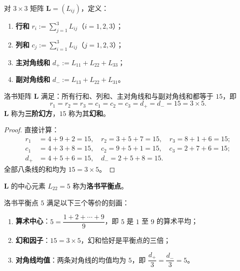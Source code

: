 \begin{definition}[行和、列和与对角线和]\label{def:luoshu_line_sums}
对 $3 \times 3$ 矩阵 $\mathbf{L} = (L_{ij})$，定义：
\begin{enumerate}[label=(\roman*)]
    \item \textbf{行和} $r_i := \sum_{j=1}^{3} L_{ij}$（$i = 1, 2, 3$）；
    \item \textbf{列和} $c_j := \sum_{i=1}^{3} L_{ij}$（$j = 1, 2, 3$）；
    \item \textbf{主对角线和} $d_+ := L_{11} + L_{22} + L_{33}$；
    \item \textbf{副对角线和} $d_- := L_{13} + L_{22} + L_{31}$。
\end{enumerate}
\end{definition}

\begin{proposition}[洛书矩阵的幻方性质]\label{prop:luoshu_magic_sum}
洛书矩阵 $\mathbf{L}$ 满足：所有行和、列和、主对角线和与副对角线和都等于 $15$，即
\[
r_1 = r_2 = r_3 = c_1 = c_2 = c_3 = d_+ = d_- = 15 = 3 \times 5.
\]
$\mathbf{L}$ 称为\textbf{三阶幻方}，$15$ 称为其\textbf{幻和}。
\end{proposition}

\begin{proof}
直接计算：
\begin{align*}
r_1 &= 4 + 9 + 2 = 15, \quad r_2 = 3 + 5 + 7 = 15, \quad r_3 = 8 + 1 + 6 = 15; \\
c_1 &= 4 + 3 + 8 = 15, \quad c_2 = 9 + 5 + 1 = 15, \quad c_3 = 2 + 7 + 6 = 15; \\
d_+ &= 4 + 5 + 6 = 15, \quad d_- = 2 + 5 + 8 = 15.
\end{align*}
全部八条线的和均为 $15 = 3 \times 5$。
\end{proof}

\begin{definition}[洛书平衡点]\label{def:luoshu_balance_point}
$\mathbf{L}$ 的中心元素 $L_{22} = 5$ 称为\textbf{洛书平衡点}。
\end{definition}

\begin{proposition}[平衡点的三重刻画]\label{prop:luoshu_balance_triple}
洛书平衡点 $5$ 满足以下三个等价的刻画：
\begin{enumerate}[label=(\roman*)]
    \item \textbf{算术中心}：$5 = \dfrac{1 + 2 + \cdots + 9}{9}$，即 $5$ 是 $1$ 至 $9$ 的算术平均；
    \item \textbf{幻和因子}：$15 = 3 \times 5$，幻和恰好是平衡点的三倍；
    \item \textbf{对角线均值}：两条对角线的均值均为 $5$，即 $\dfrac{d_+}{3} = \dfrac{d_-}{3} = 5$。
\end{enumerate}
\end{proposition}

